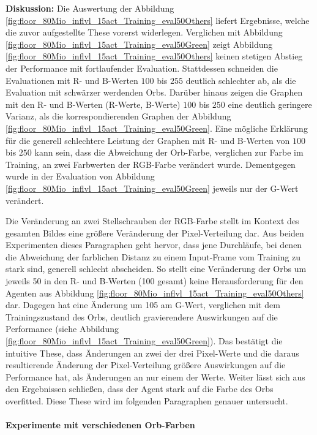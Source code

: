 \textbf{Diskussion:} Die Auswertung der Abbildung \ref{fig:floor_80Mio_inflvl_15act_Training_eval50Others} liefert Ergebnisse, welche die zuvor aufgestellte These vorerst widerlegen. Verglichen mit Abbildung \ref{fig:floor_80Mio_inflvl_15act_Training_eval50Green} zeigt Abbildung \ref{fig:floor_80Mio_inflvl_15act_Training_eval50Others} keinen stetigen Abstieg der Performance mit fortlaufender Evaluation. Stattdessen schneiden die Evaluationen mit R- und B-Werten $100$ bis $255$ deutlich schlechter ab, als die Evaluation mit schwärzer werdenden Orbs. Darüber hinaus zeigen die Graphen mit den R- und B-Werten (R-Werte, B-Werte) $100$ bis $250$ eine deutlich geringere Varianz, als die korrespondierenden Graphen der Abbildung \ref{fig:floor_80Mio_inflvl_15act_Training_eval50Green}. Eine mögliche Erklärung für die generell schlechtere Leistung der Graphen mit R- und B-Werten von $100$ bis $250$ kann sein, dass die Abweichung der Orb-Farbe, verglichen zur Farbe im Training, an zwei Farbwerten der RGB-Farbe verändert wurde. Dementgegen wurde in der Evaluation von Abbildung \ref{fig:floor_80Mio_inflvl_15act_Training_eval50Green} jeweils nur der G-Wert verändert. 

Die Veränderung an zwei Stellschrauben der RGB-Farbe stellt im Kontext des gesamten Bildes eine größere Veränderung der Pixel-Verteilung dar. Aus beiden Experimenten dieses Paragraphen geht hervor, dass jene Durchläufe, bei denen die Abweichung der farblichen Distanz zu einem Input-Frame vom Training zu stark sind, generell schlecht abscheiden. So stellt eine Veränderung der Orbs um jeweils 50 in den R- und B-Werten (100 gesamt) keine Herausforderung für den Agenten aus Abbildung \ref{fig:floor_80Mio_inflvl_15act_Training_eval50Others} dar. Dagegen hat eine Änderung um 105 am G-Wert, verglichen mit dem Trainingszustand des Orbs, deutlich gravierendere Auswirkungen auf die Performance (siehe Abbildung \ref{fig:floor_80Mio_inflvl_15act_Training_eval50Green}).  
Das bestätigt die intuitive These, dass Änderungen an zwei der drei Pixel-Werte und die daraus resultierende Änderung der Pixel-Verteilung größere Auswirkungen auf die Performance hat, als Änderungen an nur einem der Werte. Weiter lässt sich aus den Ergebnissen schließen, dass der Agent stark auf die Farbe des Orbs overfitted. Diese These wird im folgenden Paragraphen genauer untersucht. 


\paragraph{Experimente mit verschiedenen Orb-Farben}
\label{par:durch_EXP_farbÄnd_rgbOrbfarben}

